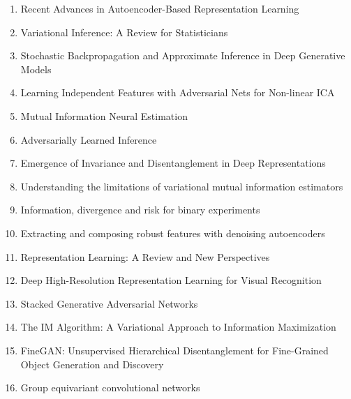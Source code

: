 \documentclass[acmlarge]{acmart}
\begin{document}
\begin{enumerate}
	\item Recent Advances in Autoencoder-Based Representation Learning \cite{Tschannen2018RecentAI} 

	\item Variational Inference: A Review for Statisticians \cite{Blei2016VariationalIA} 

	\item Stochastic Backpropagation and Approximate Inference in Deep Generative Models \cite{Rezende2014StochasticBA} 

	\item Learning Independent Features with Adversarial Nets for Non-linear ICA \cite{Brakel2018LearningIF} 

	\item Mutual Information Neural Estimation \cite{Belghazi2018MutualIN} 

	\item Adversarially Learned Inference \cite{Dumoulin2017AdversariallyLI} 

	\item Emergence of Invariance and Disentanglement in Deep Representations \cite{Achille2018EmergenceOI} 

	\item Understanding the limitations of variational mutual information estimators \cite{song2019understanding} 

	\item Information, divergence and risk for binary experiments \cite{reid2011information} 

	\item Extracting and composing robust features with denoising autoencoders \cite{vincent2008extracting} 

	\item Representation Learning: A Review and New Perspectives \cite{Bengio2013RepresentationLA} 

	\item Deep High-Resolution Representation Learning for Visual Recognition \cite{Wang2020DeepHR} 

	\item Stacked Generative Adversarial Networks \cite{Huang2017StackedGA} 

	\item The IM Algorithm: A Variational Approach to Information Maximization \cite{Barber2003TheIA} 

	\item FineGAN: Unsupervised Hierarchical Disentanglement for Fine-Grained Object Generation and Discovery \cite{Singh2019FineGANUH} 

	\item Group equivariant convolutional networks \cite{cohen2016group} 

\end{enumerate}
\newpage


\end{document}
